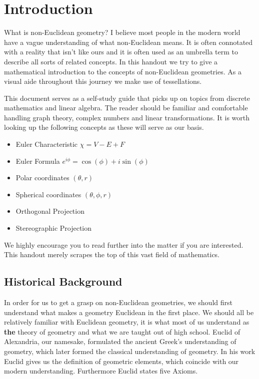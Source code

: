 \section{Introduction}\label{introduction}

What is non-Euclidean geometry? I believe most people in the modern
world have a vague understanding of what non-Euclidean means. It is
often connotated with a reality that isn't like ours and it is often
used as an umbrella term to describe all sorts of related concepts. In
this handout we try to give a mathematical introduction to the concepts
of non-Euclidean geometries. As a visual aide throughout this journey we
make use of tessellations.

This document serves as a self-study guide that picks up on topics from
discrete mathematics and linear algebra. The reader should be familiar
and comfortable handling graph theory, complex numbers and linear
transformations. It is worth looking up the following concepts as these
will serve as our basis.

\begin{itemize}
\tightlist
\item
  Euler Characteristic \(\chi = V - E + F\)
\item
  Euler Formula \(e^{i \phi} = \cos(\phi) + i \sin(\phi)\)
\item
  Polar coordinates \((\theta, r)\)
\item
  Spherical coordinates \((\theta, \phi, r)\)
\item
  Orthogonal Projection
\item
  Stereographic Projection
\end{itemize}

We highly encourage you to read further into the matter if you are
interested. This handout merely scrapes the top of this vast field of
mathematics.

\subsection{Historical Background}\label{historical-background}

In order for us to get a grasp on non-Euclidean geometries, we should
first understand what makes a geometry Euclidean in the first place. We
should all be relatively familiar with Euclidean geometry, it is what
most of us understand as \textbf{the} theory of geometry and what we are
taught out of high school. Euclid of Alexandria, our namesake,
formulated the ancient Greek's understanding of geometry, which later
formed the classical understanding of geometry. In his work Euclid gives
us the definition of geometric elements, which coincide with our modern
understanding. Furthermore Euclid states five Axioms.

